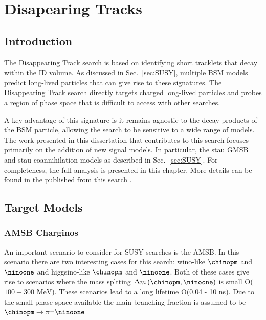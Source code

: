 \chapter{Disapearing Tracks}
\label{ch:llp_search_dt}

\section{Introduction}
\label{ch:dt_intro}
The Disappearing Track search is based on identifying short tracklets that decay within the ID volume. As discussed in Sec.~\ref{sec:SUSY}, multiple BSM models predict long-lived particles that can give rise to these signatures. The Disappearing Track search directly targets charged long-lived particles and probes a region of phase space that is difficult to access with other searches.

A key advantage of this signature is it remains agnostic to the decay products of the BSM particle, allowing the search to be sensitive to a wide range of models. The work presented in this dissertation that contributes to this search focuses primarily on the addition of new signal models. In particular, the stau GMSB and stau coannihilation models as described in Sec.~\ref{sec:SUSY}. For completeness, the full analysis is presented in this chapter. More details can be found in the published from this search \cite{atlascollaboration2026searchlonglivedcharginostausleptons}. 


\section{Target Models}

\subsection{AMSB Charginos}
An important scenario to consider for SUSY searches is the AMSB. In this scenario there are two interesting cases for this search: wino-like $\chinopm$ and $\ninoone$ and higgsino-like $\chinopm$ and $\ninoone$. Both of these cases give rise to scenarios where the mass spltting $\Delta m\left(\chinopm, \ninoone\right)$ is small O($100-300 \text{ MeV}$). These scenarios lead to a long lifetime O(0.04 - 10 ns). Due to the small phase space available the main branching fraction is assumed to be $\chinopm \to \pi^{\pm}\ninoone$



